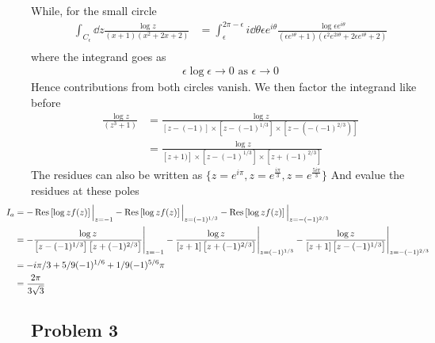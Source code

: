 \documentclass[a4paper,12pt]{article}
\begin{document}
While, for the small circle
\begin{equation}
	\begin{aligned}
		\int_{C_\epsilon} \dd z \frac{\log z}{(x+1)(x^2+2x+2)}&=\int_{\epsilon}^{2\pi-\epsilon} i\dd \theta \epsilon e^{i\theta} \frac{\log \epsilon e^{i\theta}}{(\epsilon e^{i\theta}+1)(\epsilon ^2e^{2i\theta}+2\epsilon e^{i\theta}+2)}\\
	\end{aligned}
\end{equation}
where the integrand goes as
\begin{equation}
	\begin{aligned}
		\epsilon\log \epsilon \to 0 \text{ as }\epsilon\to 0
	\end{aligned}
\end{equation}
Hence contributions from both circles vanish. We then factor the integrand like before
\begin{equation}
\begin{aligned}
	\frac{\log z}{(z^3+1)}&= \frac{\log z}{[z-(-1)]\times \left[z-(-1)^{1/3}\right]\times \left[z-(-(-1)^{2/3})\right]}\\
	 &=\frac{\log z}{[z+1)]\times \left[z-(-1)^{1/3}\right]\times \left[z+(-1)^{2/3}\right]}
\end{aligned}
\end{equation}
The residues can also be written as $\{z=e^{i\pi},z=e^{\frac{i \pi }{3}},z=e^{\frac{5 i \pi }{3}}\}$
And evalue the residues at these poles
\begin{equation}\hspace*{-1cm}
	\begin{aligned}
		I_a&=-\Res\left[\log z f(z)\right]\Big|_{z=-1}-\Res\left[\log zf(z)\right]\Big|_{z=(-1)^{1/3}}-\Res\left[\log zf(z)\right]\Big|_{z=-(-1)^{2/3}}\\
		&=-\frac{\log z}{\left[z-(-1)^{1/3}\right] \left[z+(-1)^{2/3}\right]}\Bigg|_{z=-1}-\frac{\log z}{[z+1] \left[z+(-1)^{2/3}\right]}\Bigg|_{z=(-1)^{1/3}}-\frac{\log z}{[z+1] \left[z-(-1)^{1/3}\right]}\Bigg|_{z=-(-1)^{2/3}}\\
		&=-i\pi/3+5/9(-1)^{1/6}+1/9(-1)^{5/6}\pi\\
		&=\frac{2 \pi }{3 \sqrt{3}}
	\end{aligned}
\end{equation}
\subsection*{Problem 3}
\end{document}
